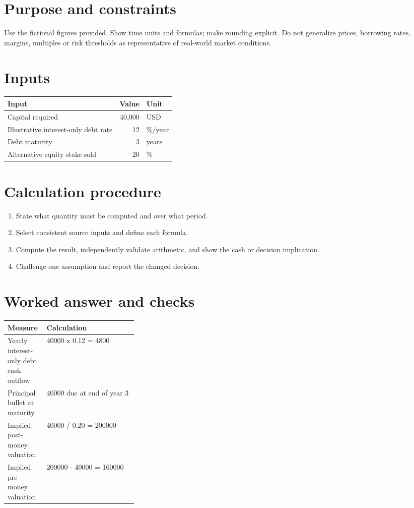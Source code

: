 \documentclass[11pt]{article}
\begin{document}
\SuiteOpen
\section{Purpose and constraints}
Use the fictional figures provided. Show time units and formulas; make rounding explicit. Do not generalize prices, borrowing rates, margins, multiples or risk thresholds as representative of real-world market conditions.
\section{Inputs}
\begin{tabularx}{\linewidth}{@{}Y r l@{}}\toprule Input & Value & Unit\\\midrule
Capital required & 40,000 & USD\\
Illustrative interest-only debt rate & 12 & \%/year\\
Debt maturity & 3 & years\\
Alternative equity stake sold & 20 & \%\\
\bottomrule\end{tabularx}
\section{Calculation procedure}
\begin{enumerate}[leftmargin=*,itemsep=5pt]
\item State what quantity must be computed and over what period.
\item Select consistent source inputs and define each formula.
\item Compute the result, independently validate arithmetic, and show the cash or decision implication.
\item Challenge one assumption and report the changed decision.
\end{enumerate}

\section{Worked answer and checks}
\begin{tabularx}{\linewidth}{@{}p{0.30\linewidth}Y@{}}\toprule Measure & Calculation\\\midrule
Yearly interest-only debt cash outflow & 40000 x 0.12 = 4800\\
Principal bullet at maturity & 40000 due at end of year 3\\
Implied post-money valuation & 40000 / 0.20 = 200000\\
Implied pre-money valuation & 200000 - 40000 = 160000\\
\bottomrule\end{tabularx}
\end{document}
